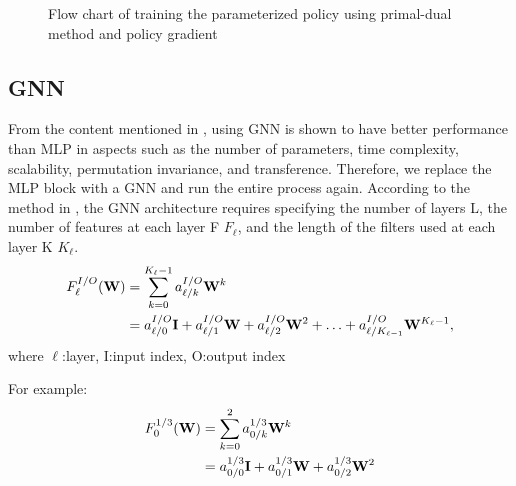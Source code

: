 \documentclass[journal,10pt,twocolumn]{IEEEtran}
\begin{document}
\begin{figure}
            \caption{Flow chart of training the parameterized policy using primal-dual method and policy gradient}
            
          \end{figure}
 
    \subsection{GNN}
        From the content mentioned in \cite{Eisen2020}, using GNN is shown to have better performance than MLP in aspects such as the number of parameters, time complexity, scalability, 
        permutation invariance, and transference. Therefore, we replace the MLP block with a GNN and run the entire process again. According to the method in \cite{Eisen2020}, 
        the GNN architecture requires specifying the number of layers L, the number of features at each layer F $F_{\ell}$, and the length of the filters used at each layer K $K_{\ell}$.
        \begin{equation}
        \begin{aligned}
            F_{\ell}^{I/O}({\bf W}) 
            &= \displaystyle\sum^{K_{\ell}-1}_{k=0}a_{\ell/k}^{I/O}{\bf W}^{k} \\
            &= a_{\ell/0}^{I/O}{\bf I} + a_{\ell/1}^{I/O}{\bf W} + a_{\ell/2}^{I/O}{\bf W}^{2} + \ldots + a_{\ell/K_{\ell-1}}^{I/O}{\bf W}^{K_{\ell}-1}, \\
        \end{aligned} 
        \end{equation}
        where  $\ell$:layer, I:input index,  O:output index 

        For example:
        \begin{equation}
        \begin{aligned}
            F_{0}^{1/3}({\bf W}) &= \displaystyle\sum^{2}_{k=0}a_{0/k}^{1/3}{\bf W}^{k} \\
            &= a_{0/0}^{1/3}{\bf I} + a_{0/1}^{1/3}{\bf W} + a_{0/2}^{1/3}{\bf W}^{2}
        \end{aligned} 
        \end{equation}
\end{document}
